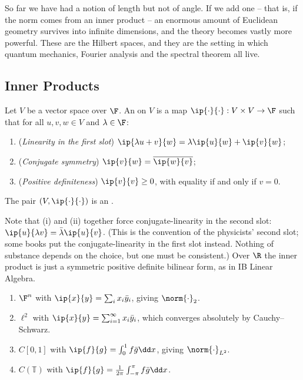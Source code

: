 So far we have had a notion of length but not of angle. If we add one -- that is, if the norm comes from an inner product -- an enormous amount of Euclidean geometry survives into infinite dimensions, and the theory becomes vastly more powerful. These are the Hilbert spaces, and they are the setting in which quantum mechanics, Fourier analysis and the spectral theorem all live.

\subsection{Inner Products}

\begin{definition}
	Let $V$ be a vector space over $\F$. An  on $V$ is a map $\ip{\cdot}{\cdot} : V \times V \to \F$ such that for all $u,v,w \in V$ and $\lambda \in \F$:
	\begin{enumerate}[label=(\roman*)]
		\item (\emph{Linearity in the first slot}) $\ip{\lambda u + v}{w} = \lambda \ip{u}{w} + \ip{v}{w}$;
		\item (\emph{Conjugate symmetry}) $\ip{v}{w} = \overline{\ip{w}{v}}$;
		\item (\emph{Positive definiteness}) $\ip{v}{v} \geq 0$, with equality if and only if $v = 0$.
	\end{enumerate}
	The pair $(V, \ip{\cdot}{\cdot})$ is an .
\end{definition}

Note that (i) and (ii) together force conjugate-linearity in the second slot: $\ip{u}{\lambda v} = \bar\lambda \ip{u}{v}$. (This is the convention of the physicists' second slot; some books put the conjugate-linearity in the first slot instead. Nothing of substance depends on the choice, but one must be consistent.) Over $\R$ the inner product is just a symmetric positive definite bilinear form, as in IB Linear Algebra.

\begin{example}
	\begin{enumerate}[label=(\roman*)]
		\item $\F^n$ with $\ip{x}{y} = \sum_i x_i \bar y_i$, giving $\norm{\cdot}_2$.
		\item $\ell^2$ with $\ip{x}{y} = \sum_{i=1}^\infty x_i \bar y_i$, which converges absolutely by Cauchy--Schwarz.
		\item $C[0,1]$ with $\ip{f}{g} = \int_0^1 f \bar g \dd x$, giving $\norm{\cdot}_{L^2}$.
		\item $C(\mathbb{T})$ with $\ip{f}{g} = \frac{1}{2\pi}\int_{-\pi}^\pi f\bar g \dd x$.
	\end{enumerate}
\end{example}

